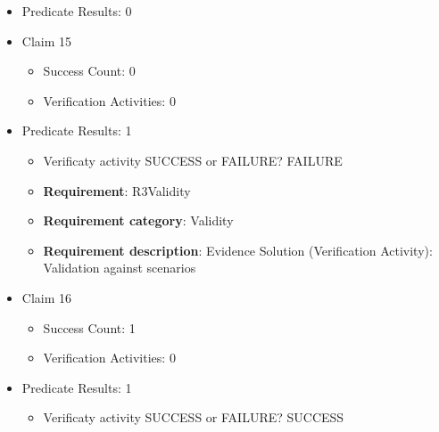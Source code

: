 \documentclass{article}
\begin{document}
\begin{itemize}
\begin{itemize}
					\item Verification activity SUCCESS or FAILURE? SUCCESS
		
						\item \textbf{Requirement}: R2FeatureCalcTTC 
						\item \textbf{Requirement category}: FunctionsCoverage 
						\item \textbf{Requirement description}: Evidence Solution (Verification Activity): Check the features and subsystems covered by the model  To stop the vehicle if TTC is equal to MinTTC
					
				\end{itemize}
				
									    
				\item Predicate Results: 0

  				  \item Claim 15
				\begin{itemize}
			    	\item Success Count: 0 
			    	\item Verification Activities: 0
				\end{itemize}
				
									    
				\item Predicate Results: 1
					\begin{itemize}				
					\item Verificaty activity SUCCESS or FAILURE? FAILURE
					
					\item \textbf{Requirement}: R3Validity 
					\item \textbf{Requirement category}: Validity
					\item \textbf{Requirement description}: Evidence Solution (Verification Activity): Validation against scenarios
					\end{itemize}

  				  \item Claim 16
				\begin{itemize}
			    	\item Success Count: 1 
			    	\item Verification Activities: 0
				\end{itemize}
				
									    
				\item Predicate Results: 1
					\begin{itemize}				
					\item Verificaty activity SUCCESS or FAILURE? SUCCESS
					

\end{itemize}
\end{itemize}
\end{document}
